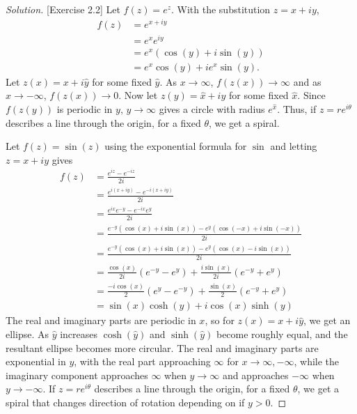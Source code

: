 \documentclass[11pt,letterpaper]{article}
\newenvironment{solution}
{\renewcommand\qedsymbol{}\begin{proof}[Solution]}
	{\end{proof}\bigskip}
\begin{document}
\begin{solution}[Exercise 2.2]
	Let $f(z) = e^z$. With the substitution $z = x + iy$,
	\[\begin{split}
		f(z) &= e^{x+iy}\\
		&=e^xe^{iy}\\
		&=e^x(\cos(y)+i\sin(y))\\
		&= e^x\cos(y) +ie^x\sin(y).
	\end{split}\]
	Let $z(x) = x + i\hat y$ for some fixed $\hat y$. As $x \to \infty$, $f(z(x)) \to \infty$ and as $x \to -\infty$, $f(z(x)) \to 0$. Now let $z(y) = \hat x + iy$ for some fixed $\hat x$. Since $f(z(y))$ is periodic in $y$, $y\to \infty$ gives a circle with radius $e^{\hat x}$. Thus, if $z = re^{i\theta}$ describes a line through the origin, for a fixed $\theta$, we get a spiral.
	
	Let $f(z) = \sin(z)$ using the exponential formula for $\sin$ and letting $z = x+iy$ gives
	\[\begin{split}
		f(z) &= \frac{e^{iz}-e^{-iz}}{2i}\\
		&= \frac{e^{i(x+iy)}-e^{-i(x+iy)}}{2i}\\
		&= \frac{e^{ix}e^{-y} -e^{-ix}e^{y}}{2i}\\
		&= \frac{e^{-y}(\cos(x)+i\sin(x))-e^y(\cos(-x)+i\sin(-x))}{2i}\\
		&= \frac{e^{-y}(\cos(x)+i\sin(x))-e^y(\cos(x)-i\sin(x))}{2i}\\
		&= \frac{\cos(x)}{2i}(e^{-y}-e^y)+\frac{i\sin(x)}{2i}(e^{-y}+e^y)\\
		&= \frac{-i\cos(x)}{2}(e^{y}-e^{-y})+\frac{\sin(x)}{2}(e^{-y}+e^y)\\
		& = \sin(x)\cosh(y) + i\cos(x)\sinh(y)
	\end{split}\]
	The real and imaginary parts are periodic in $x$, so for $z(x) = x + i\hat y$, we get an ellipse. As $\hat y$ increases $\cosh(\hat y)$ and $\sinh(\hat y)$ become roughly equal, and the resultant ellipse becomes more circular. The real and imaginary parts are exponential in $y$, with the real part approaching $\infty$ for $x\to \infty,-\infty$, while the imaginary component approaches $\infty$ when $y\to \infty$ and approaches $-\infty$ when $y\to -\infty$. If $z = re^{i\theta}$ describes a line through the origin, for a fixed $\theta$, we get a spiral that changes direction of rotation depending on if $y > 0$. 
	

\end{solution}
\end{document}
